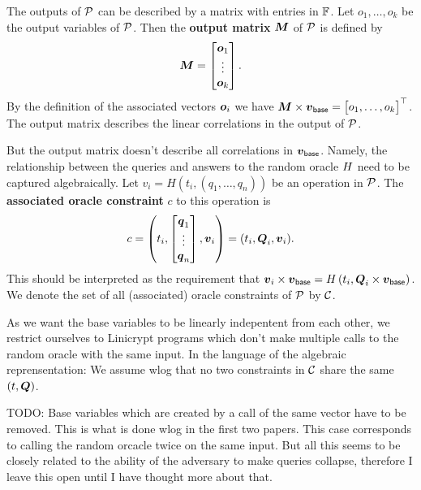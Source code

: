 The outputs of $\P$ can be described by a matrix with entries in $\F$.
Let $o_1, \dots, o_k$ be the output variables of $\P$.
Then the \textbf{output matrix} $\M$ of $\P$ is defined by
\[
  \M =
  \begin{bmatrix}
  \v o_1\\
  \vdots \\
  \v o_k
  \end{bmatrix}
  .
\]
By the definition of the associated vectors $\v o_i$ we have
$
\M \times \vbase = 
  \begin{bmatrix} 
  o_1, 
  \dots,
  o_k 
  \end{bmatrix}^\top
$.
The output matrix describes the linear correlations in the output of $\P$.

But the output matrix doesn't describe all correlations in $\vbase$.
Namely, the relationship between the queries and answers to the random oracle $\H$ need to be captured algebraically.
Let $v_i = H(t_i, (q_1, \dots, q_n))$ be an operation in $\P$.
The \textbf{associated oracle constraint} $c$ to this operation is
\[
  c = \left( t_i, \begin{bmatrix}
  \v q_1 \\
  \vdots \\
  \v q_n
  \end{bmatrix},
  \v v_i \right)
	=
	(t_i, \Q_i, \v v_i)
	.
\]
This should be interpreted as the requirement that
$
\v v_i \times \vbase = \H \left( t_i, \Q_i \times \vbase \right)
$.
We denote the set of all (associated) oracle constraints of $\P$ by $\C$.

As we want the base variables to be linearly indepentent from each other,
we restrict ourselves to Linicrypt programs which don't make multiple calls to the random oracle with the same input.
In the language of the algebraic reprensentation:
We assume wlog that no two constraints in $\C$ share the same $(t, \Q)$.


TODO: Base variables which are created by a call of the same vector have to be removed.
This is what is done wlog in the first two papers.
This case corresponds to calling the random orcacle twice on the same input.
But all this seems to be closely related to the ability of the adversary to make queries collapse,
therefore I leave this open until I have thought more about that.

